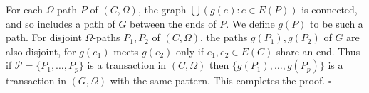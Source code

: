 For each $\Omega$-path $P$ of $(C, \Omega)$, the graph $\bigcup (g(e): e \in E(P))$ is connected, and so includes a path of $G$ between the ends of $P$. We define $g(P)$ to be such a path. For disjoint $\Omega$-paths $P_1, P_2$ of $(C, \Omega)$, the paths $g(P_1), g(P_2)$ of $G$ are also disjoint, for $g(e_1)$ meets $g(e_2)$ only if $e_1, e_2 \in E(C)$ share an end. Thus if $\mathcal{P} = \{P_1, \dots, P_p\}$ is a transaction in $(C, \Omega)$ then $\{g(P_1), \dots, g(P_p)\}$ is a transaction in $(G, \Omega)$ with the same pattern. This completes the proof. $\square$
